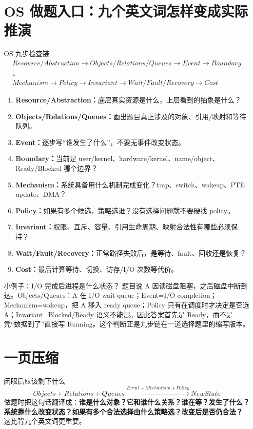 \documentclass[11pt,a4paper,openany]{ctexbook}
\newcommand{\key}[1]{\textbf{\color{deep}#1}}
\begin{document}
\section{OS 做题入口：九个英文词怎样变成实际推演}
\begin{examBox}{OS 九步检查链}
\[
\boxed{\begin{gathered}
Resource/Abstraction\rightarrow Objects/Relations/Queues\rightarrow Event\rightarrow Boundary\\
\downarrow\\
Mechanism\rightarrow Policy\rightarrow Invariant\rightarrow Wait/Fault/Recovery\rightarrow Cost
\end{gathered}}
\]
\begin{enumerate}
  \item \key{Resource/Abstraction：}底层真实资源是什么，上层看到的抽象是什么？
  \item \key{Objects/Relations/Queues：}画出题目真正涉及的对象、引用/映射和等待队列。
  \item \key{Event：}逐步写“谁发生了什么”，不要无事件改变状态。
  \item \key{Boundary：}当前是 user/kernel、hardware/kernel、name/object、Ready/Blocked 哪个边界？
  \item \key{Mechanism：}系统具备用什么机制完成变化？trap、switch、wakeup、PTE update、DMA？
  \item \key{Policy：}如果有多个候选，策略选谁？没有选择问题就不要硬找 policy。
  \item \key{Invariant：}权限、互斥、容量、引用生命周期、映射合法性有哪些必须保持？
  \item \key{Wait/Fault/Recovery：}正常路径失败后，是等待、fault、回收还是恢复？
  \item \key{Cost：}最后计算等待、切换、访存/I/O 次数等代价。
\end{enumerate}
\end{examBox}

\begin{methodbox}{小例子：I/O 完成后进程是什么状态？}
题目说 A 因读磁盘阻塞，之后磁盘中断到达。Objects/Queues：A 在 I/O wait queue；Event=I/O completion；Mechanism=wakeup，把 A 移入 ready queue；Policy 只有在调度时才决定是否选 A；Invariant=Blocked/Ready 语义不能混。因此答案首先是 Ready，而不是凭“数据到了”直接写 Running。这个判断正是九步链在一道选择题里的缩写版本。
\end{methodbox}

\section{一页压缩}
\begin{corebox}{闭眼后应该剩下什么}
\[
\boxed{Objects+Relations+Queues\xrightarrow{Event+Mechanism+Policy}NewState}
\]
做题时把这句话翻译成：\key{谁是什么对象？它和谁什么关系？谁在等？发生了什么？系统靠什么改变状态？如果有多个合法选择由什么策略选？改变后是否仍合法？} 这比背九个英文词更重要。
\end{corebox}
\end{document}
